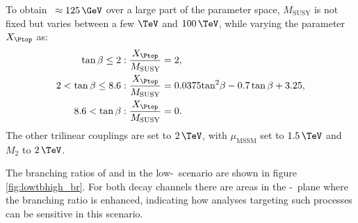 To obtain \mh~$\approx125\,\GeV$ over a large part of the parameter
space, 
$M_{\text{SUSY}}$ is not fixed but varies between a few $\TeV$ and $100\,\TeV$, while
varying the parameter $X_{\Ptop}$ as:
\begin{equation}
\begin{split}
\tan{\beta} \leq 2 &: \frac{X_{\Ptop}}{M_{\text{SUSY}}} = 2,\\
2 < \tan{\beta} \leq 8.6 &: \frac{X_{\Ptop}}{M_{\text{SUSY}}} = 0.0375\text{tan}^2\beta - 0.7\tan{\beta} + 3.25,\\
8.6 < \tan{\beta} &: \frac{X_{\Ptop}}{M_{\text{SUSY}}} = 0.
\end{split}
\end{equation}
The other trilinear couplings are set to $2\,\TeV$, with $\mu_{\text{MSSM}}$ set to $1.5\,\TeV$ and $M_2$ to $2\,\TeV$.

The branching ratios of \Htohh and \AtoZh in the low-\tanb~scenario are shown in
figure \ref{fig:lowtbhigh_br}. For both decay channels there are areas in the \mA-\tanb~plane
where the branching ratio is enhanced, indicating how analyses targeting such processes 
can be sensitive in this scenario. %

